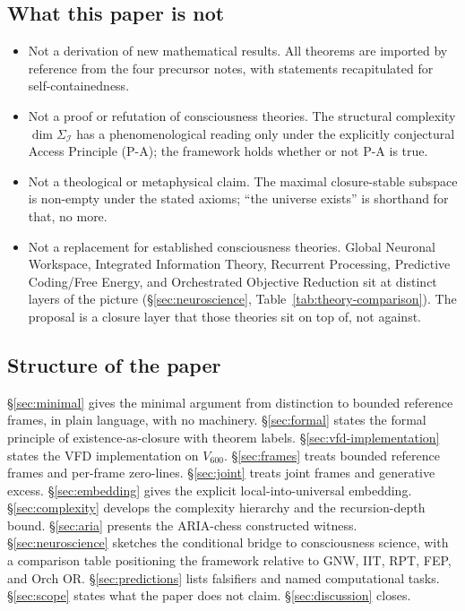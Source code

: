 \documentclass[11pt]{article}
\theoremstyle{plain}
\theoremstyle{definition}
\theoremstyle{remark}
\newcommand{\Ical}{\mathcal{I}}
\begin{document}
\subsection{What this paper is not}

\begin{itemize}[leftmargin=2em]
\item Not a derivation of new mathematical results. All theorems are imported by reference from the four precursor notes, with statements recapitulated for self-containedness.
\item Not a proof or refutation of consciousness theories. The structural complexity $\dim \Sigma_\Ical$ has a phenomenological reading only under the explicitly conjectural Access Principle (P-A); the framework holds whether or not P-A is true.
\item Not a theological or metaphysical claim. The maximal closure-stable subspace is non-empty under the stated axioms; ``the universe exists'' is shorthand for that, no more.
\item Not a replacement for established consciousness theories. Global Neuronal Workspace, Integrated Information Theory, Recurrent Processing, Predictive Coding/Free Energy, and Orchestrated Objective Reduction sit at distinct layers of the picture (\S\ref{sec:neuroscience}, Table~\ref{tab:theory-comparison}). The proposal is a closure layer that those theories sit on top of, not against.
\end{itemize}

\subsection{Structure of the paper}

\S\ref{sec:minimal} gives the minimal argument from distinction to bounded reference frames, in plain language, with no machinery. \S\ref{sec:formal} states the formal principle of existence-as-closure with theorem labels. \S\ref{sec:vfd-implementation} states the VFD implementation on $V_{600}$. \S\ref{sec:frames} treats bounded reference frames and per-frame zero-lines. \S\ref{sec:joint} treats joint frames and generative excess. \S\ref{sec:embedding} gives the explicit local-into-universal embedding. \S\ref{sec:complexity} develops the complexity hierarchy and the recursion-depth bound. \S\ref{sec:aria} presents the ARIA-chess constructed witness. \S\ref{sec:neuroscience} sketches the conditional bridge to consciousness science, with a comparison table positioning the framework relative to GNW, IIT, RPT, FEP, and Orch OR. \S\ref{sec:predictions} lists falsifiers and named computational tasks. \S\ref{sec:scope} states what the paper does not claim. \S\ref{sec:discussion} closes.
\end{document}
